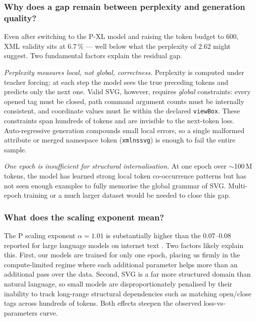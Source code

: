 \documentclass[11pt,a4paper]{article}
\begin{document}
\subsubsection*{Why does a gap remain between perplexity and generation quality?}

Even after switching to the \textmu P-XL model and raising the token budget to 600,
XML validity sits at 6.7\,\% --- well below what the perplexity of 2.62 might suggest.
Two fundamental factors explain the residual gap.

\emph{Perplexity measures local, not global, correctness.}  Perplexity is computed
under teacher forcing: at each step the model sees the true preceding tokens and predicts
only the next one.  Valid SVG, however, requires \emph{global} constraints: every
opened tag must be closed, path command argument counts must be internally consistent,
and coordinate values must lie within the declared \texttt{viewBox}.  These constraints
span hundreds of tokens and are invisible to the next-token loss.  Auto-regressive
generation compounds small local errors, so a single malformed attribute or merged
namespace token (\texttt{xmlnssvg}) is enough to fail the entire sample.

\emph{One epoch is insufficient for structural internalisation.}  At one epoch over
$\sim$100\,M tokens, the model has learned strong local token co-occurrence patterns
but has not seen enough examples to fully memorise the global grammar of SVG.
Multi-epoch training or a much larger dataset would be needed to close this gap.

\subsubsection*{What does the scaling exponent mean?}

The \textmu P scaling exponent $\alpha = 1.01$ is substantially higher than the
$0.07$--$0.08$ reported for large language models on internet text
\citep{kaplan2020scaling}.  Two factors likely explain this.  First, our models are
trained for only one epoch, placing us firmly in the compute-limited regime where each
additional parameter helps more than an additional pass over the data.  Second, SVG is
a far more structured domain than natural language, so small models are
disproportionately penalised by their inability to track long-range structural
dependencies such as matching open/close tags across hundreds of tokens.  Both effects
steepen the observed loss-vs-parameters curve.
\end{document}
